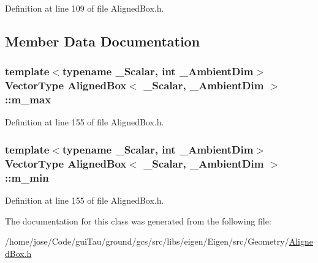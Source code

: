 Definition at line 109 of file Aligned\-Box.\-h.



\subsection{Member Data Documentation}
\hypertarget{class_aligned_box_a10b7690d3a414b036b6db22577a24b57}{
\subsubsection[{m\-\_\-max}]{\setlength{\rightskip}{0pt plus 5cm}template$<$typename \-\_\-\-Scalar, int \-\_\-\-Ambient\-Dim$>$ {\bf Vector\-Type} {\bf Aligned\-Box}$<$ \-\_\-\-Scalar, \-\_\-\-Ambient\-Dim $>$\-::m\-\_\-max\hspace{0.3cm}{\ttfamily [protected]}}}\label{class_aligned_box_a10b7690d3a414b036b6db22577a24b57}


Definition at line 155 of file Aligned\-Box.\-h.

\hypertarget{class_aligned_box_ae25b586e6518366ce238a5a58d026770}{
\subsubsection[{m\-\_\-min}]{\setlength{\rightskip}{0pt plus 5cm}template$<$typename \-\_\-\-Scalar, int \-\_\-\-Ambient\-Dim$>$ {\bf Vector\-Type} {\bf Aligned\-Box}$<$ \-\_\-\-Scalar, \-\_\-\-Ambient\-Dim $>$\-::m\-\_\-min\hspace{0.3cm}{\ttfamily [protected]}}}\label{class_aligned_box_ae25b586e6518366ce238a5a58d026770}


Definition at line 155 of file Aligned\-Box.\-h.



The documentation for this class was generated from the following file\-:\begin{DoxyCompactItemize}
\item 
/home/jose/\-Code/gui\-Tau/ground/gcs/src/libs/eigen/\-Eigen/src/\-Geometry/\hyperlink{_aligned_box_8h}{Aligned\-Box.\-h}\end{DoxyCompactItemize}
